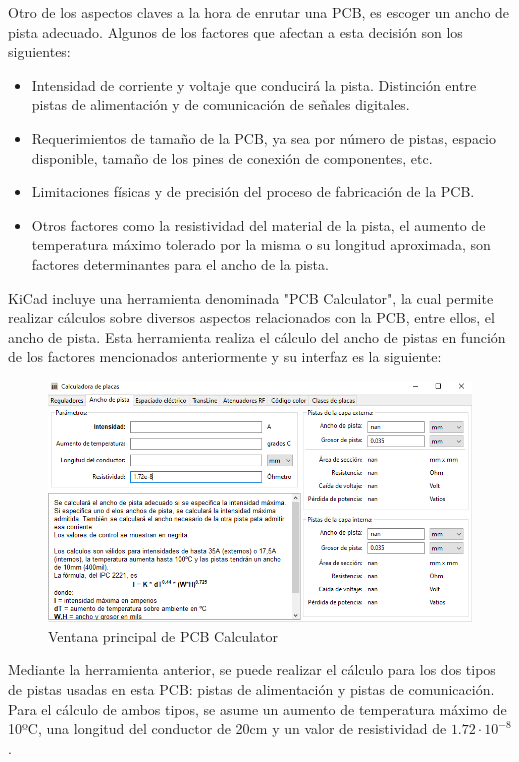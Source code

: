 Otro de los aspectos claves a la hora de enrutar una PCB, es escoger un ancho de pista adecuado. Algunos de los factores que afectan a esta decisión son los siguientes:
\begin{itemize}
    \item Intensidad de corriente y voltaje que conducirá la pista. Distinción entre pistas de alimentación y de comunicación de señales digitales.
    \item Requerimientos de tamaño de la PCB, ya sea por número de pistas, espacio disponible, tamaño de los pines de conexión de componentes, etc.
    \item Limitaciones físicas y de precisión del proceso de fabricación de la PCB.
    \item Otros factores como la resistividad del material de la pista, el aumento de temperatura máximo tolerado por la  misma o su longitud aproximada, son factores determinantes para el ancho de la pista.
\end{itemize}

KiCad incluye una herramienta denominada "PCB Calculator", la cual permite realizar cálculos sobre diversos aspectos relacionados con la PCB, entre ellos, el ancho de pista. Esta herramienta realiza el cálculo del ancho de pistas en función de los factores mencionados anteriormente y su interfaz es la siguiente:

\begin{figure}[H]
\centering 
\includegraphics[width=0.9\linewidth]{pictures/PCBCalculator.PNG}
\caption{Ventana principal de PCB Calculator}
\label{fig:kdiagram}
\end{figure}

Mediante la herramienta anterior, se puede realizar el cálculo para los dos tipos de pistas usadas en esta PCB: pistas de alimentación y pistas de comunicación. Para el cálculo de ambos tipos, se asume un aumento de temperatura máximo de 10ºC, una longitud del conductor de 20cm y un valor de resistividad de $1.72 \cdot 10 ^{-8}$.


